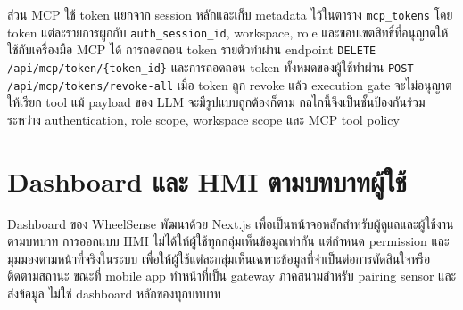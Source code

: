 ส่วน MCP ใช้ token แยกจาก session หลักและเก็บ metadata ไว้ในตาราง \texttt{mcp\_tokens} โดย token แต่ละรายการผูกกับ \texttt{auth\_session\_id}, workspace, role และขอบเขตสิทธิ์ที่อนุญาตให้ใช้กับเครื่องมือ MCP ได้ การถอดถอน token รายตัวทำผ่าน endpoint \texttt{DELETE /api/mcp/token/\{token\_id\}} และการถอดถอน token ทั้งหมดของผู้ใช้ทำผ่าน \texttt{POST /api/mcp/tokens/revoke-all} เมื่อ token ถูก revoke แล้ว execution gate จะไม่อนุญาตให้เรียก tool แม้ payload ของ LLM จะมีรูปแบบถูกต้องก็ตาม กลไกนี้จึงเป็นชั้นป้องกันร่วมระหว่าง authentication, role scope, workspace scope และ MCP tool policy

\section{Dashboard และ HMI ตามบทบาทผู้ใช้}
\label{sec:ch3_hmi}
Dashboard ของ WheelSense พัฒนาด้วย Next.js เพื่อเป็นหน้าจอหลักสำหรับผู้ดูแลและผู้ใช้งานตามบทบาท การออกแบบ HMI ไม่ได้ให้ผู้ใช้ทุกกลุ่มเห็นข้อมูลเท่ากัน แต่กำหนด permission และมุมมองตามหน้าที่จริงในระบบ เพื่อให้ผู้ใช้แต่ละกลุ่มเห็นเฉพาะข้อมูลที่จำเป็นต่อการตัดสินใจหรือติดตามสถานะ ขณะที่ mobile app ทำหน้าที่เป็น gateway ภาคสนามสำหรับ pairing sensor และส่งข้อมูล ไม่ใช่ dashboard หลักของทุกบทบาท

